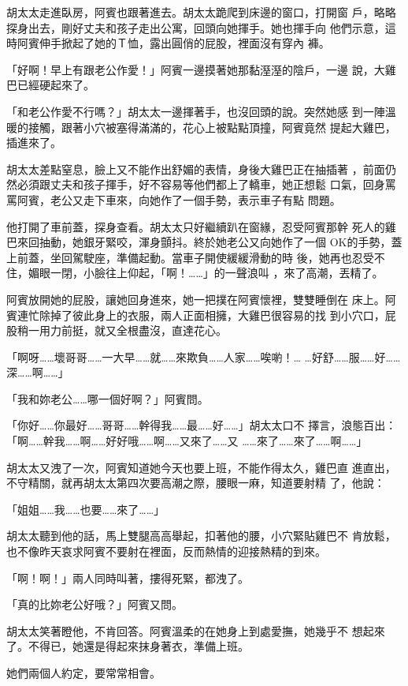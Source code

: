 胡太太走進臥房，阿賓也跟著進去。胡太太跪爬到床邊的窗口，打開窗
戶，略略探身出去，剛好丈夫和孩子走出公寓，回頭向她揮手。她也揮手向
他們示意，這時阿賓伸手掀起了她的Ｔ恤，露出圓俏的屁股，裡面沒有穿內
褲。

「好啊！早上有跟老公作愛！」阿賓一邊摸著她那黏溼溼的陰戶，一邊
說，大雞巴已經硬起來了。

「和老公作愛不行嗎？」胡太太一邊揮著手，也沒回頭的說。突然她感
到一陣溫暖的接觸，跟著小穴被塞得滿滿的，花心上被點點頂撞，阿賓竟然
提起大雞巴，插進來了。

胡太太差點窒息，臉上又不能作出舒媚的表情，身後大雞巴正在抽插著
，前面仍然必須跟丈夫和孩子揮手，好不容易等他們都上了轎車，她正想鬆
口氣，回身罵罵阿賓，老公又走下車來，向她作了一個手勢，表示車子有點
問題。

他打開了車前蓋，探身查看。胡太太只好繼續趴在窗緣，忍受阿賓那幹
死人的雞巴來回抽動，她銀牙緊咬，渾身顫抖。終於她老公又向她作了一個
OK的手勢，蓋上前蓋，坐回駕駛座，準備起動。當車子開使緩緩滑動的時
後，她再也忍受不住，媚眼一閉，小臉往上仰起，「啊！……」的一聲浪叫
，來了高潮，丟精了。

阿賓放開她的屁股，讓她回身進來，她一把撲在阿賓懷裡，雙雙睡倒在
床上。阿賓連忙除掉了彼此身上的衣服，兩人正面相擁，大雞巴很容易的找
到小穴口，屁股稍一用力前挺，就又全根盡沒，直達花心。

「啊呀……壞哥哥……一大早……就……來欺負……人家……唉喲！…
…好舒……服……好……深……啊……」

「我和妳老公……哪一個好啊？」阿賓問。

「你好……你最好……哥哥……幹得我……最……好……」胡太太口不
擇言，浪態百出：「啊……幹我……啊……好好哦……啊……又來了……又
……來了……來了……啊……」

胡太太又洩了一次，阿賓知道她今天也要上班，不能作得太久，雞巴直
進直出，不守精關，就再胡太太第四次要高潮之際，腰眼一麻，知道要射精
了，他說：

「姐姐……我……也要……來了……」

胡太太聽到他的話，馬上雙腿高高舉起，扣著他的腰，小穴緊貼雞巴不
肯放鬆，也不像昨天哀求阿賓不要射在裡面，反而熱情的迎接熱精的到來。

「啊！啊！」兩人同時叫著，摟得死緊，都洩了。

「真的比妳老公好哦？」阿賓又問。

胡太太笑著瞪他，不肯回答。阿賓溫柔的在她身上到處愛撫，她幾乎不
想起來了。不得已，她還是得起來抹身著衣，準備上班。

她們兩個人約定，要常常相會。










